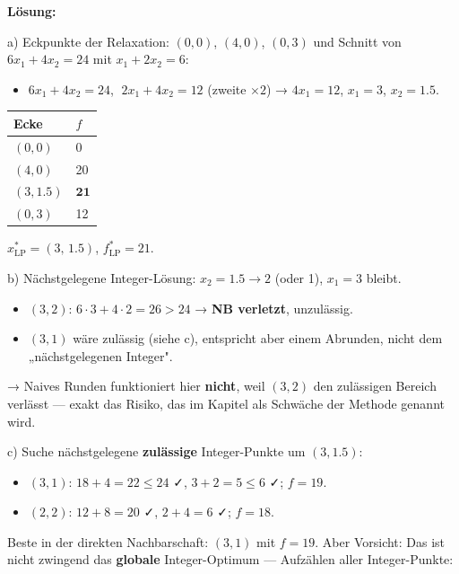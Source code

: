 \documentclass[11pt, a4paper]{article}
\begin{document}
\textbf{Lösung:}


a) Eckpunkte der Relaxation: $(0,0)$, $(4,0)$, $(0,3)$ und Schnitt von $6x_1+4x_2=24$ mit $x_1+2x_2=6$:

\begin{itemize}
  \item $6x_1 + 4x_2 = 24$, $\;2x_1 + 4x_2 = 12$ (zweite $\times 2$)  →  $4x_1 = 12$, $x_1 = 3$, $x_2 = 1.5$.
\end{itemize}


{\small
\begin{tabularx}{\linewidth}{XX}
\hline
\rowcolor{tableheadbg}
{\color{white}\textbf{Ecke}} & {\color{white}\textbf{$f$}} \\[2pt]
\hline
\endhead
\hline
\endfoot
$(0,0)$ & 0 \\
$(4,0)$ & 20 \\
$(3,1.5)$ & $\mathbf{21}$ \\
$(0,3)$ & 12 \\
\end{tabularx}
}


$x^*_{\text{LP}} = (3,\,1.5)$, $f^*_{\text{LP}} = 21$.


b) Nächstgelegene Integer-Lösung: $x_2 = 1.5 \to 2$ (oder 1), $x_1 = 3$ bleibt.

\begin{itemize}
  \item $(3, 2)$: $6\cdot 3 + 4\cdot 2 = 26 > 24$ → \textbf{NB verletzt}, unzulässig.
  \item $(3, 1)$ wäre zulässig (siehe c), entspricht aber einem Abrunden, nicht dem „nächstgelegenen Integer".
\end{itemize}

→ Naives Runden funktioniert hier \textbf{nicht}, weil $(3,2)$ den zulässigen Bereich verlässt — exakt das Risiko, das im Kapitel als Schwäche der Methode genannt wird.


c) Suche nächstgelegene \textbf{zulässige} Integer-Punkte um $(3, 1.5)$:

\begin{itemize}
  \item $(3, 1)$: $18+4=22\leq24$ ✓, $3+2=5\leq6$ ✓; $f = 19$.
  \item $(2, 2)$: $12+8=20$ ✓, $2+4=6$ ✓; $f = 18$.
\end{itemize}

Beste in der direkten Nachbarschaft: $(3,1)$ mit $f=19$. Aber Vorsicht: Das ist nicht zwingend das \textbf{globale} Integer-Optimum — Aufzählen aller Integer-Punkte:
\end{document}

